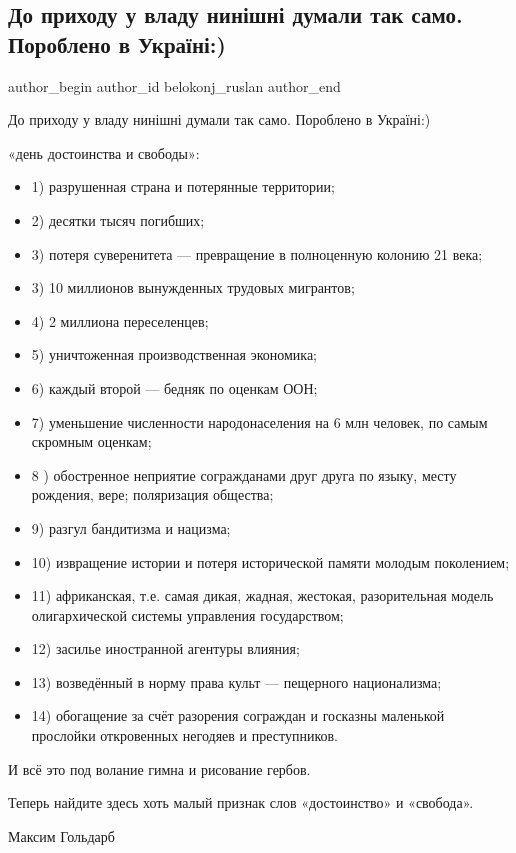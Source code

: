  
 
 
 
 
 
\subsection{До приходу у владу нинішні думали так само. Пороблено в Україні:)}
\label{sec:21_11_2021.fb.belokonj_ruslan.1.porobleno_v_ukraini}
 
\ifcmt
 author_begin
   author_id belokonj_ruslan
 author_end
\fi

До приходу у владу нинішні думали так само. Пороблено в Україні:)

«день достоинства и свободы»:

\begin{itemize}
  \item 1) разрушенная страна и потерянные территории;
  \item 2) десятки тысяч погибших;
  \item 3) потеря суверенитета — превращение в полноценную колонию 21 века;
  \item 3) 10 миллионов вынужденных трудовых мигрантов; 
  \item 4) 2 миллиона переселенцев; 
  \item 5) уничтоженная производственная экономика;
  \item 6) каждый второй — бедняк по оценкам ООН;  
  \item 7) уменьшение численности народонаселения на 6 млн человек, по самым скромным оценкам;
  \item 8 ) обостренное неприятие согражданами друг друга по языку, месту рождения, вере; поляризация общества;
  \item 9) разгул бандитизма и нацизма; 
  \item 10) извращение истории и потеря исторической памяти молодым поколением;
  \item 11) африканская, т.е. самая дикая, жадная, жестокая, разорительная модель олигархической системы управления государством; 
  \item 12) засилье иностранной агентуры влияния;
  \item 13) возведённый в норму права культ — пещерного национализма;
  \item 14) обогащение за счёт разорения сограждан и госказны маленькой прослойки откровенных негодяев и преступников. 
\end{itemize}

И всё это под волание гимна и рисование гербов. 

Теперь найдите здесь хоть малый признак слов «достоинство» и «свобода».

Максим Гольдарб
